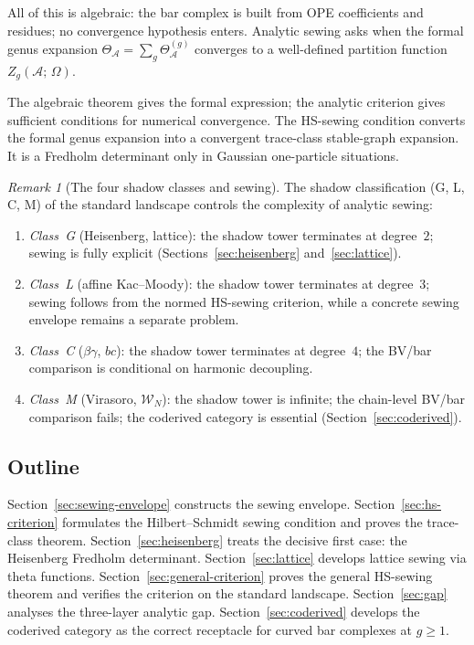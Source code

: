 \documentclass[11pt,reqno]{amsart}
\theoremstyle{definition}
\theoremstyle{remark}
\newtheorem{remark}[theorem]{Remark}
\newcommand{\cA}{\mathcal{A}}
\newcommand{\cW}{\mathcal{W}}
\numberwithin{equation}{section}
\begin{document}
All of this is algebraic: the bar complex is built from OPE
coefficients and residues; no convergence hypothesis enters.
Analytic sewing asks when the formal genus expansion
$\Theta_\cA = \sum_g \Theta_\cA^{(g)}$ converges to a
well-defined partition function~$Z_g(\cA;\,\Omega)$.

The algebraic theorem gives the formal expression; the analytic
criterion gives sufficient conditions for numerical convergence.
The HS-sewing condition converts the formal genus expansion into a
convergent trace-class stable-graph expansion. It is a Fredholm
determinant only in Gaussian one-particle situations.

\begin{remark}[The four shadow classes and
 sewing]\label{rem:shadow-sewing-intro}
The shadow classification (G, L, C, M) of the standard
landscape controls the complexity of analytic sewing:
\begin{enumerate}[label=\textup{(\alph*)}]
\item \emph{Class~G} (Heisenberg, lattice): the shadow tower
 terminates at degree~$2$; sewing is
 fully explicit (Sections~\ref{sec:heisenberg}
 and~\ref{sec:lattice}).
\item \emph{Class~L} (affine Kac--Moody): the shadow tower
 terminates at degree~$3$; sewing follows from the normed
 HS-sewing criterion, while a concrete sewing envelope remains a
 separate problem.
\item \emph{Class~C} ($\beta\gamma$, $bc$): the shadow tower
 terminates at degree~$4$; the BV/bar comparison is
 conditional on harmonic decoupling.
\item \emph{Class~M} (Virasoro, $\cW_N$): the shadow tower is
 infinite; the chain-level BV/bar comparison fails; the
 coderived category is essential
 (Section~\ref{sec:coderived}).
\end{enumerate}
\end{remark}

\subsection{Outline}

Section~\ref{sec:sewing-envelope} constructs the sewing
envelope.  Section~\ref{sec:hs-criterion} formulates the
Hilbert--Schmidt sewing condition and proves the trace-class
theorem.  Section~\ref{sec:heisenberg} treats the decisive
first case: the Heisenberg Fredholm determinant.
Section~\ref{sec:lattice} develops lattice sewing via theta
functions.  Section~\ref{sec:general-criterion} proves the
general HS-sewing theorem and verifies the criterion on the
standard landscape.  Section~\ref{sec:gap} analyses the
three-layer analytic gap.  Section~\ref{sec:coderived}
develops the coderived category as the correct receptacle for
curved bar complexes at $g \geq 1$.
\end{document}
